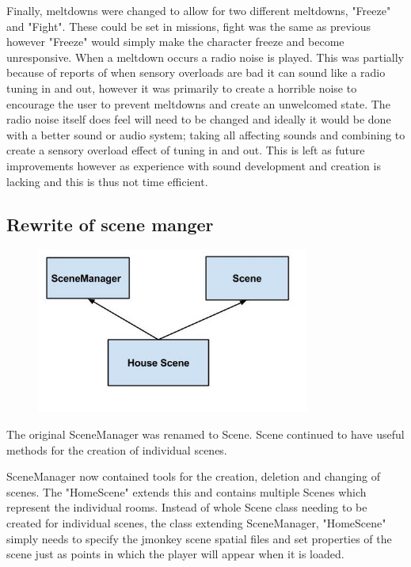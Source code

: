 \documentclass[11pt]{report}
\begin{document}
Finally, meltdowns were changed to allow for two different meltdowns, "Freeze" and "Fight". These could be set in missions, fight was the same as previous however "Freeze" would simply make the character freeze and become unresponsive. When a meltdown occurs a radio noise is played. This was partially because of reports of when sensory overloads are bad it can sound like a radio tuning in and out, however it was primarily to create a horrible noise to encourage the user to prevent meltdowns and create an unwelcomed state. The radio noise itself does feel will need to be changed and ideally it would be done with a better sound or audio system; taking all affecting sounds and combining to create a sensory overload effect of tuning in and out. This is left as future improvements however as experience with sound development and creation is lacking and this is thus not time efficient. 

\subsection{Rewrite of scene manger}

\begin{figure}[H]
\centering
\includegraphics[width=90mm]{images/scenemanager.jpg}
\caption{}
\label{scenemanager}
\end{figure}

The original SceneManager was renamed to Scene. Scene continued to have useful methods for the creation of individual scenes. 

SceneManager now contained tools for the creation, deletion and changing of scenes. The "HomeScene" extends this and contains multiple Scenes which represent the individual rooms. Instead of whole Scene class needing to be created for individual scenes, the class extending SceneManager, "HomeScene" simply needs to specify the jmonkey scene spatial files and set properties of the scene just as points in which the player will appear when it is loaded. 
\end{document}
